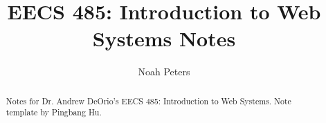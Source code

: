 \documentclass[a4paper]{report}
\author{Noah Peters}
\title{EECS 485: Introduction to Web Systems Notes}
\begin{document}
\maketitle

\begin{abstract}
	Notes for Dr. Andrew DeOrio's EECS 485: Introduction to Web Systems. Note template by Pingbang Hu.
\end{abstract}

\newpage

\tableofcontents



% 

\newpage
\printbibliography
\end{document}
